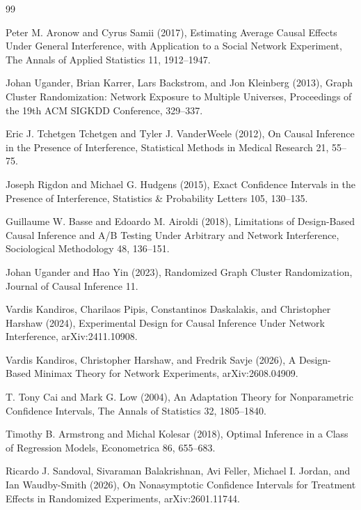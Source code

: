 \documentclass{article}
\begin{document}
\begin{thebibliography}{99}

   Peter M. Aronow and Cyrus Samii (2017), Estimating Average Causal Effects Under General Interference, with Application to a Social Network Experiment, The Annals of Applied Statistics 11, 1912--1947.

   Johan Ugander, Brian Karrer, Lars Backstrom, and Jon Kleinberg (2013), Graph Cluster Randomization: Network Exposure to Multiple Universes, Proceedings of the 19th ACM SIGKDD Conference, 329--337.

   Eric J. Tchetgen Tchetgen and Tyler J. VanderWeele (2012), On Causal Inference in the Presence of Interference, Statistical Methods in Medical Research 21, 55--75.

   Joseph Rigdon and Michael G. Hudgens (2015), Exact Confidence Intervals in the Presence of Interference, Statistics \& Probability Letters 105, 130--135.

   Guillaume W. Basse and Edoardo M. Airoldi (2018), Limitations of Design-Based Causal Inference and A/B Testing Under Arbitrary and Network Interference, Sociological Methodology 48, 136--151.

   Johan Ugander and Hao Yin (2023), Randomized Graph Cluster Randomization, Journal of Causal Inference 11.

   Vardis Kandiros, Charilaos Pipis, Constantinos Daskalakis, and Christopher Harshaw (2024), Experimental Design for Causal Inference Under Network Interference, arXiv:2411.10908.

   Vardis Kandiros, Christopher Harshaw, and Fredrik Savje (2026), A Design-Based Minimax Theory for Network Experiments, arXiv:2608.04909.

   T. Tony Cai and Mark G. Low (2004), An Adaptation Theory for Nonparametric Confidence Intervals, The Annals of Statistics 32, 1805--1840.

   Timothy B. Armstrong and Michal Kolesar (2018), Optimal Inference in a Class of Regression Models, Econometrica 86, 655--683.

   Ricardo J. Sandoval, Sivaraman Balakrishnan, Avi Feller, Michael I. Jordan, and Ian Waudby-Smith (2026), On Nonasymptotic Confidence Intervals for Treatment Effects in Randomized Experiments, arXiv:2601.11744.


\end{thebibliography}
\end{document}
